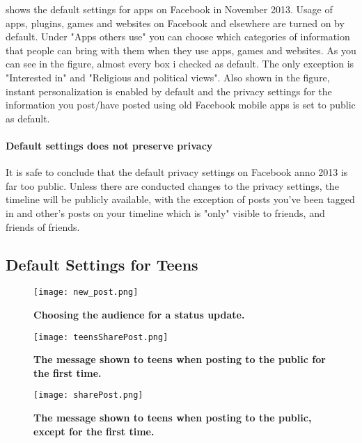  shows the default settings for apps on Facebook in November 2013. Usage of apps, plugins, games and websites on Facebook and elsewhere are turned on by default. Under "Apps others use" you can choose which categories of information that people can bring with them when they use apps, games and websites. As you can see in the figure, almost every box i checked as default. The only exception is "Interested in" and "Religious and political views". Also shown in the figure, instant personalization is enabled by default and the privacy settings for the information you post/have posted using old Facebook mobile apps is set to public as default. 

\paragraph{Default settings does not preserve privacy} It is safe to conclude that the default privacy settings on Facebook anno 2013 is far too public. Unless there are conducted changes to the privacy settings, the timeline will be publicly available, with the exception of posts you've been tagged in and other's posts on your timeline which is "only" visible to friends, and friends of friends. 

\subsection{Default Settings for Teens}

\begin{figure}[t]
\centering
\texttt{[image: new\_post.png]}
\caption[Choosing who can see a status update.]{\textbf{Choosing the audience for a status update.}}
\label{fig:newPost}
\end{figure}

\begin{figure}[b]
\centering
\texttt{[image: teensSharePost.png]}
\caption[The message shown to teens when posting to the public for the first time]{\textbf{The message shown to teens when posting to the public for the first time.}} 
\label{fig:teensSharePost}
\end{figure}

\begin{figure}[t]
\centering
\texttt{[image: sharePost.png]}
\caption [The message shown to teens when posting to the public, except for the first time]{\textbf{The message shown to teens when posting to the public, except for the first time.}} 
\label{fig:sharePost}
\end{figure}

